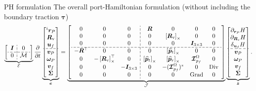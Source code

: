 \documentclass[aspectratio=169]{ISAE-Beamer}
\DeclareMathOperator*{\Grad}{Grad}
\DeclareMathOperator*{\Div}{Div}
\newcommand{\crmat}[1]{\ensuremath{\left[#1\right]_\times}}
\begin{document}
\begin{frame}{PH formulation}
The overall port-Hamiltonian formulation (without including the boundary traction $\bm{\tau}$)
\begin{equation*}
\setlength{\dashlinegap}{2pt}
\underbrace{
{\left[ \begin{array}{c:c}
	\bm{I} & 0 \\
	\hdashline
	0 & \mathcal{M} \\
	\end{array} \right]}
}_{\mathcal{E}}
\diffp{}{t}
\underbrace{\begin{bmatrix}
^i \bm{r}_P \\ \bm{R}_{\text{v}} \\ \bm{u}_f \\\hdashline  \bm{v}_P \\ \bm\omega_P  \\ \bm{v}_f  \\ \bm\Sigma \\
\end{bmatrix}}_{\bm{e}} = 
\underbrace{
{\left[ \begin{array}{ccc:cccc}
	0 & 0 & 0 &  \bm{R} & 0 & 0 & 0 \\
	0 & 0 & 0 & 0 & \crmat{\bm{R}_{\text{v}}} & 0 & 0 \\
	0 & 0 & 0 & 0 & 0 & \bm{I}_{3\times 3} & 0  \\ 
	\hdashline
	-\bm{R}^\top & 0 & 0 & 0 & \crmat{\widehat{\bm{p}}_t} & 0 & 0 \\
	0 & -\crmat{\bm{R}_{\text{v}}}^\top & 0 & \crmat{\widehat{\bm{p}}_t} & \crmat{\widehat{\bm{p}}_r} & \bm{\mathcal{I}}_{p_f}^\Omega & 0 \\
	0 & 0 & -\bm{I}_{3\times 3} & 0 & -(\bm{\mathcal{I}}_{p_f}^\Omega)^* & 0 & \Div \\
	0 & 0 & 0 & 0 & 0 & \Grad & 0 \\
	\end{array} \right]}
}_{\mathcal{J}}
\underbrace{\begin{bmatrix}
\partial_{\bm{r}_P}H \\ \partial_{\bm{R}_\text{v}}H \\ \delta_{\bm{u}_f} H \\\hdashline  \bm{v}_P \\ \bm\omega_P  \\ \bm{v}_f  \\ \bm\Sigma \\
\end{bmatrix}}_{\bm{z}}.
\end{equation*} 

\end{frame}
\end{document}
